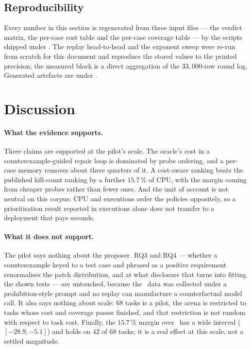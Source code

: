 \subsection{Reproducibility}

Every number in this section is regenerated from three input files --- the
verdict matrix, the per-case cost table and the per-case coverage table ---
by the scripts shipped under . The replay head-to-head
and the exponent sweep were re-run from scratch for this document and
reproduce the stored values to the printed precision; the measured block is a
direct aggregation of the $33{,}000$-row round log. Generated artefacts are
under .

\section{Discussion}
\label{sec:pilot-discussion}

\paragraph{What the evidence supports.} Three claims are supported at the
pilot's scale. The oracle's cost in a counterexample-guided repair loop is
dominated by probe ordering, and a per-case memory removes about three quarters
of it. A cost-aware ranking beats the published kill-count ranking by a
further $15.7\,\%$ of CPU, with the margin coming from cheaper probes rather
than fewer ones. And the unit of account is not neutral on this corpus: CPU and
executions order the policies oppositely, so a prioritisation result reported
in executions alone does not transfer to a deployment that pays seconds.

\paragraph{What it does not support.} The pilot says nothing about the
proposer. RQ3 and RQ4 --- whether a counterexample keyed to a test case and
phrased as a positive requirement renormalises the patch distribution, and at
what disclosure that turns into fitting the shown tests --- are untouched,
because the \cegmem\ data was collected under a prohibition-style prompt and no
replay can manufacture a counterfactual model call. It also says nothing about
scale: $68$ tasks is a pilot, the arena is restricted to tasks whose cost and
coverage passes finished, and that restriction is not random with respect to
task cost. Finally, the $15.7\,\%$ margin over \frtp\ has a wide interval
($[-28.9, -5.1]$) and holds on $42$ of $68$ tasks; it is a real effect at this
scale, not a settled magnitude.

